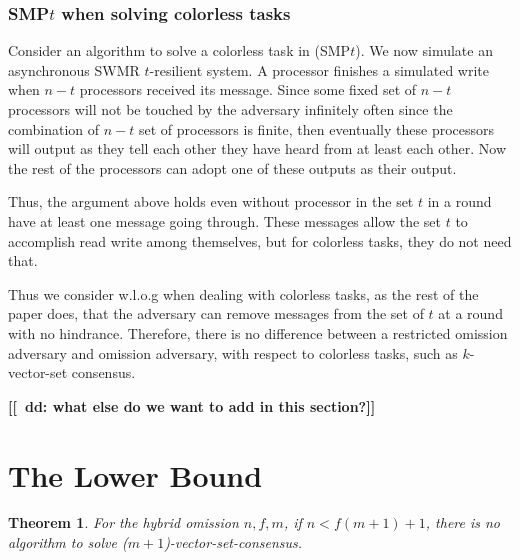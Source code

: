 \documentclass[11pt]{article}
\newtheorem{theorem}{Theorem}
\newcounter{todocounter}
\newcommand{\todonum}
{\stepcounter{todocounter}{(\thetodocounter)}}
\newcommand{\dd}[1]{\textbf{\color{blue}
[[\todonum\ dd: #1]]}}
\begin{document}
{\subsubsection*{SMP$t$ when solving colorless tasks}
Consider an algorithm to solve a colorless task in (SMP$t$). 
We now simulate an asynchronous SWMR $t$-resilient system. A processor
finishes a simulated write when $n-t$ processors received its message. Since some fixed
set of $n-t$ processors will not be touched by the adversary infinitely often since the combination of $n-t$ set
of processors is finite, then eventually these processors will output as they tell each other they have heard
from at least each other. Now the rest of the processors can adopt one of these outputs as their output.

Thus, the argument above holds even without processor in the set $t$ in a round have at least one message
going through. These messages allow the set $t$ to accomplish read write among themselves, but for 
colorless tasks, they do not need that.

Thus we consider w.l.o.g when dealing with colorless tasks, as the rest of the paper does,
that the adversary can remove messages from the set of $t$ at a round with no hindrance. Therefore, there is no difference between a restricted omission adversary and omission adversary, with respect to colorless tasks, such as $k$-vector-set consensus.

\dd{what else do we want to add in this section?}
}
 \section{The Lower Bound}\label{sec:lower-bound}

\begin{theorem}
For the hybrid omission $n,f,m$, if $n<f(m+1)+1$, there is no algorithm to solve ($m+1$)-vector-set-consensus.
\end{theorem}
\end{document}
